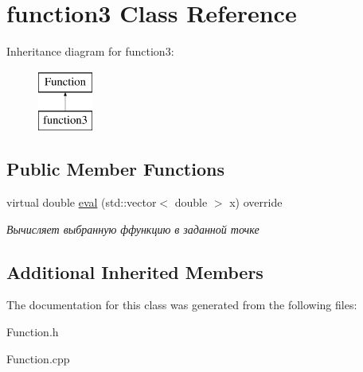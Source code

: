 \hypertarget{classfunction3}{}\section{function3 Class Reference}
\label{classfunction3}
Inheritance diagram for function3\+:\begin{figure}[H]
\begin{center}
\leavevmode
\includegraphics[height=2.000000cm]{classfunction3}
\end{center}
\end{figure}
\subsection*{Public Member Functions}
\begin{DoxyCompactItemize}
\item 
\mbox{\label{classfunction3_aeeb95e4688599d08134d56f51cdf4268}} 
virtual double \mbox{\hyperlink{classfunction3_aeeb95e4688599d08134d56f51cdf4268}{eval}} (std\+::vector$<$ double $>$ x) override
\begin{DoxyCompactList}\small\item\em Вычисляет выбранную ффункцию в заданной точке \end{DoxyCompactList}\end{DoxyCompactItemize}
\subsection*{Additional Inherited Members}


The documentation for this class was generated from the following files\+:\begin{DoxyCompactItemize}
\item 
Function.\+h\item 
Function.\+cpp\end{DoxyCompactItemize}

